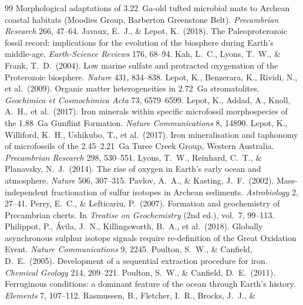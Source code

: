 \documentclass[11pt]{article}
\begin{document}
\begin{thebibliography}{99}
Morphological adaptations of 3.22~Ga-old tufted microbial mats to Archean coastal habitats (Moodies
Group, Barberton Greenstone Belt). \textit{Precambrian Research} 266, 47--64.
 Javaux, E.~J., \& Lepot, K.\ (2018). The Paleoproterozoic
fossil record: implications for the evolution of the biosphere during Earth's middle-age.
\textit{Earth-Science Reviews} 176, 68--94.
 Kah, L.~C., Lyons, T.~W., \& Frank, T.~D.\ (2004). Low marine
sulfate and protracted oxygenation of the Proterozoic biosphere. \textit{Nature} 431, 834--838.
 Lepot, K., Benzerara, K., Rividi, N., et al.\ (2009). Organic
matter heterogeneities in 2.72~Ga stromatolites. \textit{Geochimica et Cosmochimica Acta} 73,
6579--6599.
 Lepot, K., Addad, A., Knoll, A.~H., et al.\ (2017). Iron
minerals within specific microfossil morphospecies of the 1.88~Ga Gunflint Formation. \textit{Nature
Communications} 8, 14890.
 Lepot, K., Williford, K.~H., Ushikubo, T., et al.\ (2017).
Iron mineralisation and taphonomy of microfossils of the 2.45--2.21~Ga Turee Creek Group, Western
Australia. \textit{Precambrian Research} 298, 530--551.
 Lyons, T.~W., Reinhard, C.~T., \& Planavsky, N.~J.\ (2014).
The rise of oxygen in Earth's early ocean and atmosphere. \textit{Nature} 506, 307--315.
 Pavlov, A.~A., \& Kasting, J.~F.\ (2002).
Mass-independent fractionation of sulfur isotopes in Archean sediments. \textit{Astrobiology} 2,
27--41.
 Perry, E.~C., \& Lefticariu, P.\ (2007). Formation and
geochemistry of Precambrian cherts. In \textit{Treatise on Geochemistry} (2nd ed.), vol.~7, 99--113.
 Philippot, P., \'{A}vila, J.~N., Killingsworth, B.~A.,
et al.\ (2018). Globally asynchronous sulphur isotope signals require re-definition of the Great
Oxidation Event. \textit{Nature Communications} 9, 2245.
 Poulton, S.~W., \& Canfield, D.~E.\ (2005).
Development of a sequential extraction procedure for iron. \textit{Chemical Geology} 214, 209--221.
 Poulton, S.~W., \& Canfield, D.~E.\ (2011).
Ferruginous conditions: a dominant feature of the ocean through Earth's history. \textit{Elements} 7,
107--112.
 Rasmussen, B., Fletcher, I.~R., Brocks, J.~J., \&

\end{thebibliography}
\end{document}
